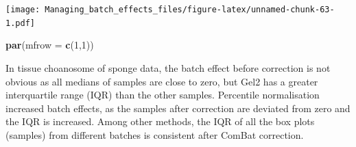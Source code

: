 \documentclass[]{book}
\newenvironment{Shaded}{\begin{snugshade}}{\end{snugshade}}
\newcommand{\KeywordTok}[1]{\textcolor[rgb]{0.13,0.29,0.53}{\textbf{#1}}}
\newcommand{\DataTypeTok}[1]{\textcolor[rgb]{0.13,0.29,0.53}{#1}}
\newcommand{\DecValTok}[1]{\textcolor[rgb]{0.00,0.00,0.81}{#1}}
\newcommand{\NormalTok}[1]{#1}
\begin{document}
\texttt{[image: Managing\_batch\_effects\_files/figure-latex/unnamed-chunk-63-1.pdf]}

\begin{Shaded}
\begin{Highlighting}[]
\KeywordTok{par}\NormalTok{(}\DataTypeTok{mfrow =} \KeywordTok{c}\NormalTok{(}\DecValTok{1}\NormalTok{,}\DecValTok{1}\NormalTok{))}
\end{Highlighting}
\end{Shaded}

In tissue choanosome of sponge data, the batch effect before correction
is not obvious as all medians of samples are close to zero, but Gel2 has
a greater interquartile range (IQR) than the other samples. Percentile
normalisation increased batch effects, as the samples after correction
are deviated from zero and the IQR is increased. Among other methods,
the IQR of all the box plots (samples) from different batches is
consistent after ComBat correction.
\end{document}
